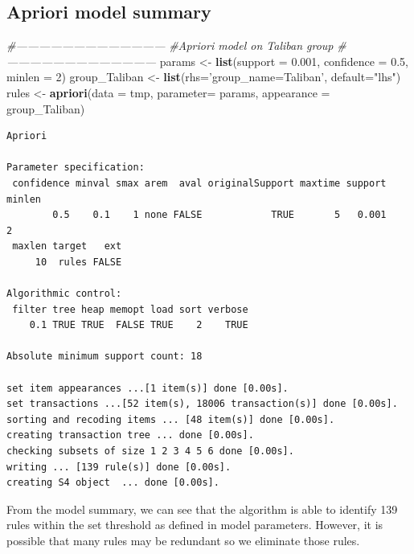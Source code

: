 \documentclass[11pt,oneside,a4paper]{reedthesis}
\newenvironment{Shaded}{\begin{snugshade}}{\end{snugshade}}
\newcommand{\KeywordTok}[1]{\textcolor[rgb]{0.13,0.29,0.53}{\textbf{#1}}}
\newcommand{\DataTypeTok}[1]{\textcolor[rgb]{0.13,0.29,0.53}{#1}}
\newcommand{\DecValTok}[1]{\textcolor[rgb]{0.00,0.00,0.81}{#1}}
\newcommand{\FloatTok}[1]{\textcolor[rgb]{0.00,0.00,0.81}{#1}}
\newcommand{\StringTok}[1]{\textcolor[rgb]{0.31,0.60,0.02}{#1}}
\newcommand{\CommentTok}[1]{\textcolor[rgb]{0.56,0.35,0.01}{\textit{#1}}}
\newcommand{\NormalTok}[1]{#1}
\begin{document}
\subsection{Apriori model summary}\label{apriori-model-summary-1}
\begin{Shaded}
\begin{Highlighting}[]
\CommentTok{#---------------------------------------}
\CommentTok{#Apriori model on Taliban group}
\CommentTok{#---------------------------------------}
\NormalTok{params <-}\StringTok{ }\KeywordTok{list}\NormalTok{(}\DataTypeTok{support =} \FloatTok{0.001}\NormalTok{, }\DataTypeTok{confidence =} \FloatTok{0.5}\NormalTok{, }\DataTypeTok{minlen =} \DecValTok{2}\NormalTok{)}
\NormalTok{group_Taliban <-}\StringTok{ }\KeywordTok{list}\NormalTok{(}\DataTypeTok{rhs=}\StringTok{'group_name=Taliban'}\NormalTok{, }\DataTypeTok{default=}\StringTok{"lhs"}\NormalTok{)}
\NormalTok{rules <-}\StringTok{ }\KeywordTok{apriori}\NormalTok{(}\DataTypeTok{data =}\NormalTok{ tmp, }
                 \DataTypeTok{parameter=}\NormalTok{ params, }
                 \DataTypeTok{appearance =}\NormalTok{ group_Taliban)}
\end{Highlighting}
\end{Shaded}
\begin{verbatim}
Apriori

Parameter specification:
 confidence minval smax arem  aval originalSupport maxtime support minlen
        0.5    0.1    1 none FALSE            TRUE       5   0.001      2
 maxlen target   ext
     10  rules FALSE

Algorithmic control:
 filter tree heap memopt load sort verbose
    0.1 TRUE TRUE  FALSE TRUE    2    TRUE

Absolute minimum support count: 18 

set item appearances ...[1 item(s)] done [0.00s].
set transactions ...[52 item(s), 18006 transaction(s)] done [0.00s].
sorting and recoding items ... [48 item(s)] done [0.00s].
creating transaction tree ... done [0.00s].
checking subsets of size 1 2 3 4 5 6 done [0.00s].
writing ... [139 rule(s)] done [0.00s].
creating S4 object  ... done [0.00s].
\end{verbatim}
From the model summary, we can see that the algorithm is able to
identify 139 rules within the set threshold as defined in model
parameters. However, it is possible that many rules may be redundant so
we eliminate those rules.
\end{document}
